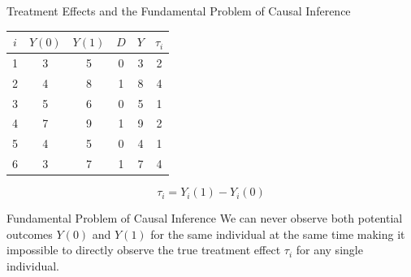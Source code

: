 \documentclass[xcolor=svgnames,t]{beamer}
\begin{document}
\begin{frame}{Treatment Effects and the Fundamental Problem of Causal Inference}

    \centering
    \begin{table}[]
        \centering
        \begin{tabular}{|c|c|c|c|c|c|}
        \hline
        \( i \) & \( Y(0) \) & \( Y(1) \) & \( D \) & \( Y \) & \( \tau_i \) \\ \hline
        1 & 3  & 5  & 0 & 3 & 2 \\ \hline
        \rowcolor{blue!20} 2 & 4  & 8  & 1 & 8 & 4 \\ \hline
        3 & 5  & 6  & 0 & 5 & 1 \\ \hline
        \rowcolor{blue!20} 4 & 7  & 9  & 1 & 9 & 2 \\ \hline
        5 & 4  & 5  & 0 & 4 & 1 \\ \hline
        \rowcolor{blue!20} 6 & 3  & 7  & 1 & 7 & 4 \\ \hline
        \end{tabular}
        \end{table}
        
        \pause \[
    \tau_i = Y_i(1) - Y_i(0)
    \]

    \pause
    \begin{block}{Fundamental Problem of Causal Inference}
    We can never observe both potential outcomes \( Y(0) \) and \( Y(1) \) for the same individual at the same time making it impossible to directly observe the true treatment effect \( \tau_i \) for any single individual.
    \end{block}
\end{frame}
\end{document}
